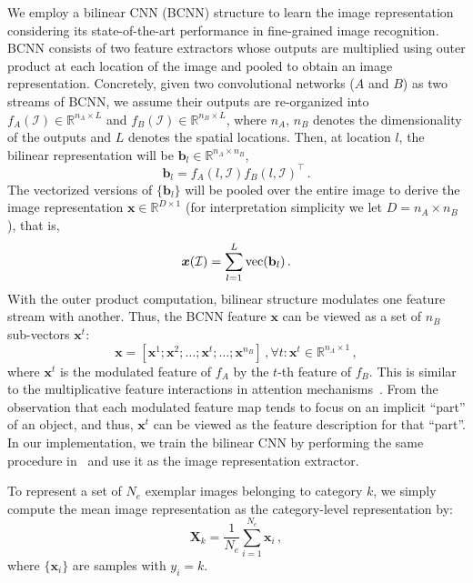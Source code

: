 \documentclass[10pt,twocolumn,letterpaper]{article}
\begin{document}
We employ a bilinear CNN (BCNN) structure \cite{Tsungyu15ICCV} to learn the image representation considering its state-of-the-art performance in fine-grained image recognition. BCNN consists of two feature extractors whose outputs are multiplied using outer product at each location of the image and pooled to obtain an image representation. Concretely, given two convolutional networks ($A$ and $B$) as two streams of BCNN, we assume their outputs are re-organized into $f_A(\mathcal{I})\in\mathbb{R}^{n_A\times{L}}$ and $f_B(\mathcal{I})\in\mathbb{R}^{n_B\times{L}}$, where $n_A$, $n_B$ denotes the dimensionality of the outputs and $L$ denotes the spatial locations. Then, at location $l$, the bilinear representation will be $\mathbf{b}_l\in\mathbb{R}^{n_A\times{n_B}}$,
\begin{equation}
\mathbf{b}_l=f_A(l,\mathcal{I}){f_B(l,\mathcal{I})}^{\intercal}\,.
\end{equation}
The vectorized versions of $\{\mathbf{b}_l\}$ will be pooled over the entire image to derive the image representation $\bm{x}\in\mathbb{R}^{D\times{1}}$ (for interpretation simplicity we let $D=n_A\times{n_B}$), that is,
\begin{equation}
\bm{x}(\mathcal{I}) = \sum_{l=1}^{L}{\rm{vec}}(\mathbf{b}_l)\,.
\end{equation}
With the outer product computation, bilinear structure modulates one feature stream with another. Thus, the BCNN feature $\bm{x}$ can be viewed as a set of $n_B$ sub-vectors $\bm{x}^t$:
\begin{equation}
\bm{x} = \left[ \bm{x}^1; \bm{x}^2; \ldots; \bm{x}^t; \ldots; \bm{x}^{n_B} \right] \,, \forall t: \bm{x}^t \in \mathbb{R}^{n_A\times 1} \,,
\end{equation}
where $\bm{x}^t$ is the modulated feature of $f_A$ by the $t$-th feature of $f_B$. This is similar to the multiplicative feature interactions in attention mechanisms~\cite{Tsungyu15ICCV}. From the observation that each modulated feature map tends to focus on an implicit ``part'' of an object, and thus, $\bm{x}^t$ can be viewed as the feature description for that ``part''. In our implementation, we train the bilinear CNN by performing the same procedure in~\cite{Tsungyu15ICCV} and use it as the image representation extractor. 

To represent a set of $N_e$ exemplar images belonging to category $k$, we simply compute the mean image representation as the category-level representation by:
\begin{equation}\label{eq:finalXe}
\bm{X}_k=\frac{1}{N_e}\sum_{i=1}^{N_e}\bm{x}_i \,,
\end{equation}
where $\{\bm{x}_i\}$ are samples with $y_i=k$.
\end{document}
